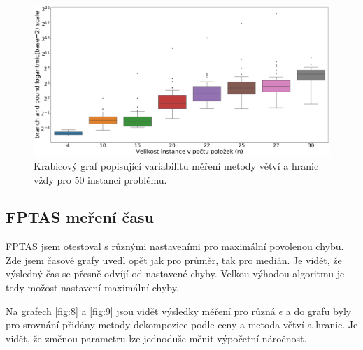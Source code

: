 \documentclass[11pt]{article}
\begin{document}
\begin{figure}[h]\centering
	\includegraphics[scale=0.2]{img/boxBB}
 	\caption[2]{Krabicový graf popisující variabilitu měření metody větví a hranic vždy pro 50 instancí problému.}\label{fig:7}
 \end{figure} 	

\subsection{FPTAS meření času}

FPTAS jsem otestoval s různými nastaveními pro maximální povolenou chybu. Zde jsem časové grafy uvedl opět jak pro průměr, tak pro medián. Je vidět, že výsledný čas se přesně odvíjí od nastavené chyby. Velkou výhodou algoritmu je tedy možost nastavení maximální chyby.

Na grafech \ref{fig:8} a \ref{fig:9} jsou vidět výsledky měření pro různá $\epsilon$ a do grafu byly pro srovnání přidány metody dekompozice podle ceny a metoda větví a hranic. Je vidět, že změnou parametru lze jednoduše měnit výpočetní náročnost.
\end{document}
